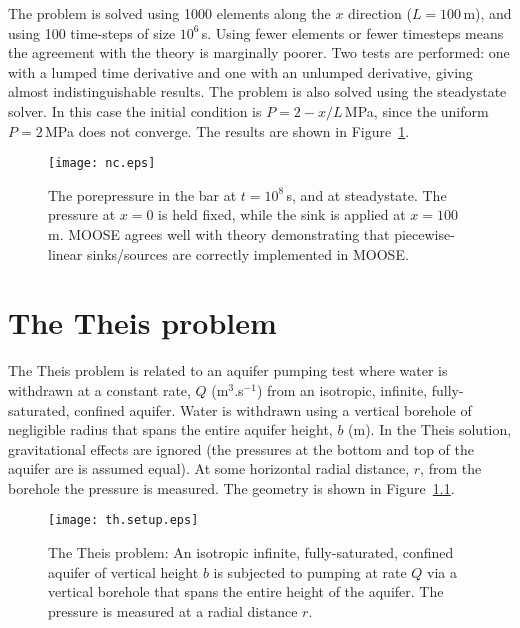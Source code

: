 \documentclass[]{scrreprt}
\begin{document}
The problem is solved using 1000 elements along the $x$ direction
($L=100$\,m), and using 100 time-steps of size $10^6$\,s.  Using fewer
elements or fewer timesteps means the agreement with the theory is
marginally poorer.  Two tests are performed: one with a lumped time
derivative and one with an unlumped derivative, giving almost
indistinguishable results.  The problem is also
solved using the steadystate solver.  In this case the initial
condition is $P=2-x/L$\,MPa, since the uniform $P=2$\,MPa does not
converge.  The results are shown in Figure~\ref{nc.fig}.

\begin{figure}[htb]
\begin{center}
\texttt{[image: nc.eps]}
\caption{The porepressure in the bar at $t=10^{8}$\,s, and at
  steadystate.  The pressure at $x=0$ is held fixed, while the sink is
  applied at $x=100$\,m.  MOOSE agrees well with theory demonstrating
  that piecewise-linear sinks/sources are correctly implemented in MOOSE.}
\label{nc.fig}
\end{center}
\end{figure}


\chapter{The Theis problem}
\label{th}

The Theis problem is related to an aquifer pumping test where water is
withdrawn at a constant rate, $Q$ (m$^{3}$.s$^{-1}$) from an
isotropic, infinite, fully-saturated, confined aquifer.  Water is withdrawn
using a vertical borehole of negligible radius that spans the entire
aquifer height, $b$ (m).  In the Theis solution, gravitational
effects are ignored (the pressures at the bottom and top of the
aquifer are is assumed equal).  At some horizontal radial distance, $r$, from
the borehole the pressure is measured.  The geometry is shown in
Figure~\ref{th.setup.fig}.

\begin{figure}[htb]
\begin{center}
\texttt{[image: th.setup.eps]}
\caption{The Theis problem: An isotropic infinite, fully-saturated,
  confined aquifer of vertical height $b$ is subjected to pumping at
  rate $Q$ via a vertical borehole that spans the entire height of the
  aquifer.  The pressure is measured at a radial distance $r$.}
\label{th.setup.fig}
\end{center}
\end{figure}
\end{document}
